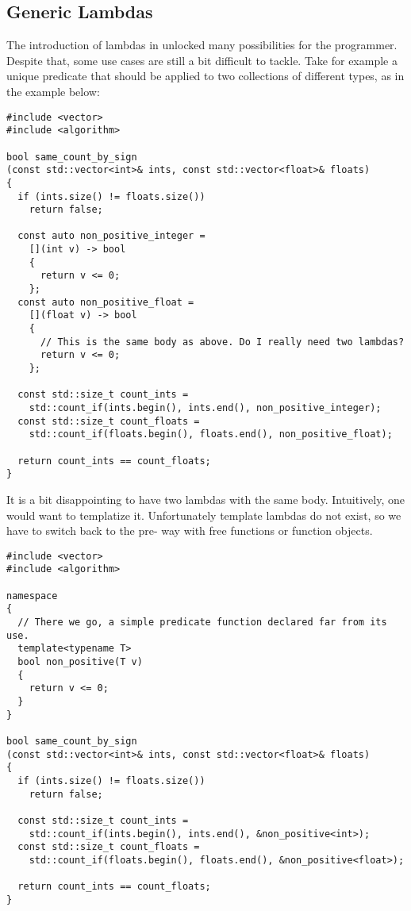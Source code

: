 \subsection{Generic Lambdas}

\problemtitle

The introduction of lambdas  in  unlocked many
possibilities for the programmer. Despite that, some use cases are
still a bit difficult to tackle. Take for example a unique predicate
that should be applied to two collections of different types, as in
the example below:

\begin{lstlisting}
#include <vector>
#include <algorithm>

bool same_count_by_sign
(const std::vector<int>& ints, const std::vector<float>& floats)
{
  if (ints.size() != floats.size())
    return false;

  const auto non_positive_integer =
    [](int v) -> bool
    {
      return v <= 0;
    };
  const auto non_positive_float =
    [](float v) -> bool
    {
      // This is the same body as above. Do I really need two lambdas?
      return v <= 0;
    };

  const std::size_t count_ints =
    std::count_if(ints.begin(), ints.end(), non_positive_integer);
  const std::size_t count_floats =
    std::count_if(floats.begin(), floats.end(), non_positive_float);

  return count_ints == count_floats;
}
\end{lstlisting}

It is a bit disappointing to have two lambdas with the same
body. Intuitively, one would want to templatize it. Unfortunately
template lambdas do not exist, so we have to switch back to the
pre- way with free functions or function objects.

\begin{lstlisting}
#include <vector>
#include <algorithm>

namespace
{
  // There we go, a simple predicate function declared far from its use.
  template<typename T>
  bool non_positive(T v)
  {
    return v <= 0;
  }
}

bool same_count_by_sign
(const std::vector<int>& ints, const std::vector<float>& floats)
{
  if (ints.size() != floats.size())
    return false;

  const std::size_t count_ints =
    std::count_if(ints.begin(), ints.end(), &non_positive<int>);
  const std::size_t count_floats =
    std::count_if(floats.begin(), floats.end(), &non_positive<float>);

  return count_ints == count_floats;
}
\end{lstlisting}

